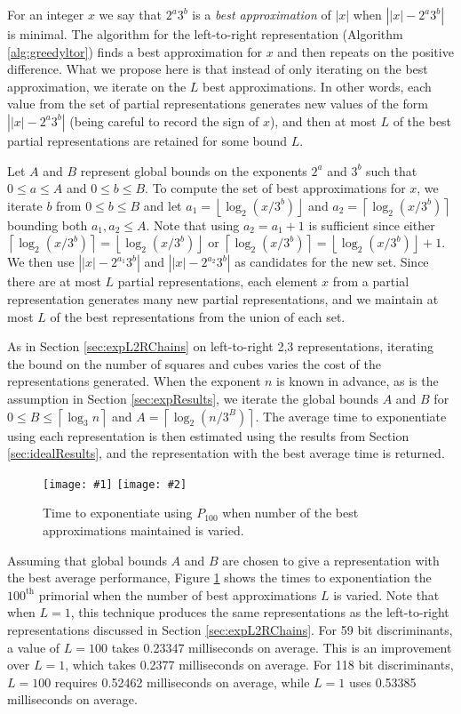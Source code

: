 \documentclass{ucalgthes1}
\theoremstyle{definition}
\newcommand{\floor}[1]{\left\lfloor #1 \right\rfloor}
\newcommand{\ceil}[1]{\left\lceil #1 \right\rceil}
\newcommand{\mygraphTwoX}[5]{
	\begin{figure}[htb]
	\centering
	\texttt{[image: \#1]}
	\texttt{[image: \#2]}
	\caption[#5]{#4}
	\label{#3}
	\end{figure}
}
\begin{document}
For an integer $x$ we say that $2^a3^b$ is a \emph{best approximation} of $|x|$ when $\left||x| - 2^a3^b \right|$ is minimal.  The algorithm for the left-to-right representation (Algorithm \ref{alg:greedyltor}) finds a best approximation for $x$ and then repeats on the positive difference.  What we propose here is that instead of only iterating on the best approximation, we iterate on the $L$ best approximations.  In other words, each value from the set of partial representations generates new values of the form $\left||x| - 2^a3^b\right|$ (being careful to record the sign of $x$), and then at most $L$ of the best partial representations are retained for some bound $L$.

Let $A$ and $B$ represent global bounds on the exponents $2^a$ and $3^b$ such that $0 \le a \le A$ and $0 \le b \le B$.  To compute the set of best approximations for $x$, we iterate $b$ from $0 \le b \le B$ and let $a_1 = \floor{\log_2 (x/3^b)}$ and $a_2 = \ceil{\log_2 (x/3^b)}$ bounding both $a_1, a_2 \le A$.  Note that using $a_2 = a_1 + 1$ is sufficient since either $\ceil{\log_2 (x/3^b)} = \floor{\log_2 (x/3^b)}$ or $\ceil{\log_2 (x/3^b)} = \floor{\log_2 (x/3^b)} + 1$.  We then use $\left||x|-2^{a_1}3^b\right|$ and $\left||x|-2^{a_2}3^b\right|$ as candidates for the new set.  Since there are at most $L$ partial representations, each element $x$ from a partial representation generates many new partial representations, and we maintain at most $L$ of the best representations from the union of each set.

As in Section \ref{sec:expL2RChains} on left-to-right 2,3 representations, iterating the bound on the number of squares and cubes varies the cost of the representations generated.  When the exponent $n$ is known in advance, as is the assumption in Section \ref{sec:expResults}, we iterate the global bounds $A$ and $B$ for $0 \le B \le \ceil{\log_3 n}$ and $A = \ceil{\log_2 (n/3^B)}$.  The average time to exponentiate using each representation is then estimated using the results from Section \ref{sec:idealResults}, and the representation with the best average time is returned.  

\mygraphTwoX{dbns_l2r_tree_vary-64}{dbns_l2r_tree_vary-128}{fig:expL2RBestVary}{Time to exponentiate using $P_100$ when number of the best approximations maintained is varied.}{Varying the Number of Best Approximations.}

Assuming that global bounds $A$ and $B$ are chosen to give a representation with the best average performance, Figure \ref{fig:expL2RBestVary} shows the times to exponentiation the $100^{\textrm{th}}$ primorial when the number of best approximations $L$ is varied.   Note that when $L=1$, this technique produces the same representations as the left-to-right representations discussed in Section \ref{sec:expL2RChains}.  For 59 bit discriminants, a value of $L=100$ takes 0.23347 milliseconds on average.  This is an improvement over $L=1$, which takes 0.2377 milliseconds on average.  For 118 bit discriminants, $L=100$ requires 0.52462 milliseconds on average, while $L=1$ uses 0.53385 milliseconds on average.
\end{document}
